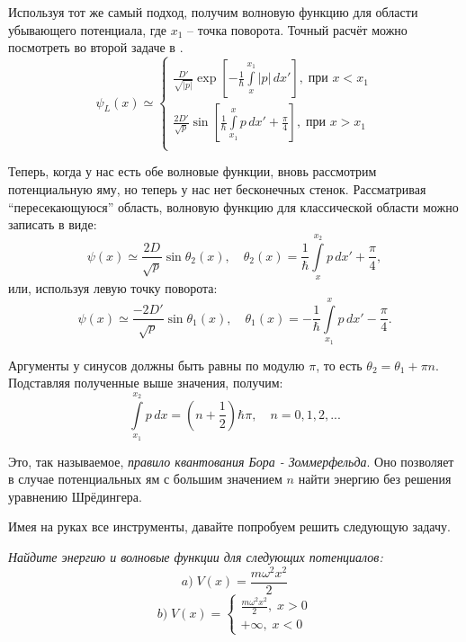 Используя тот же самый подход, получим волновую функцию для области убывающего потенциала, где $x_1$ -- точка поворота. Точный расчёт можно посмотреть во второй задаче в .
\[
\psi_L(x) \simeq 
\begin{cases}
    \frac{D'}{\sqrt{|p|}}\exp\left[-\frac{1}{\hbar} \int\limits_{x}^{x_1} |p|\,dx' \right],\; \text{при } x < x_1\\
    \frac{2D'}{\sqrt{p}}\sin\left[ \frac{1}{\hbar} \int\limits_{x_1}^{x} p\,dx' + \frac{\pi}{4} \right], \; \text{при } x > x_1\\
\end{cases}
\]

Теперь, когда у нас есть обе волновые функции, вновь рассмотрим потенциальную яму, но теперь у нас нет бесконечных стенок. Рассматривая ``пересекающуюся'' область, волновую функцию для классической области можно записать в виде:
\[
\psi(x) \simeq \frac{2D}{\sqrt{p}}\sin\theta_2(x),\quad \theta_2(x) = \frac{1}{\hbar}\int\limits_{x}^{x_2}p\,dx' + \frac{\pi}{4},
\]
или, используя левую точку поворота:
\[
\psi(x) \simeq \frac{-2D'}{\sqrt{p}}\sin\theta_1(x),\quad \theta_1(x) = -\frac{1}{\hbar}\int\limits_{x_1}^{x}p\,dx' - \frac{\pi}{4}.
\]

Аргументы у синусов должны быть равны по модулю $\pi$, то есть $\theta_2 = \theta_1 + \pi n$. Подставляя полученные выше значения, получим:
\[
\int\limits_{x_1}^{x_2}p\, dx = (n + \frac{1}{2})\hbar\pi,\quad n = 0, 1, 2, ...
\]

Это, так называемое, \textit{правило квантования Бора - Зоммерфельда}. Оно позволяет в случае потенциальных ям с большим значением $n$ найти энергию без решения уравнению Шрёдингера. 

Имея на руках все инструменты, давайте попробуем решить следующую задачу.

\begin{center}
    \textit{Найдите энергию и волновые функции для следующих потенциалов:}
    \[
    a)\;V(x) = \frac{m\omega^2 x^2}{2}
    \]
    \[
    b)\;V(x) = 
    \begin{cases}
     \frac{m\omega^2 x^2}{2},\;x > 0\\
    +\infty,\; x < 0
    \end{cases}
    \]
\end{center}

